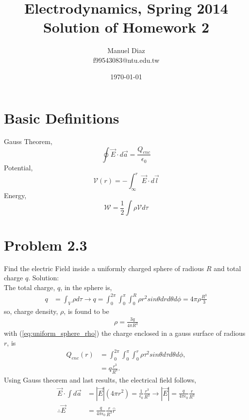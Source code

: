 

%

\title{Electrodynamics, Spring 2014 \\ Solution of Homework 2}
\author{Manuel Diaz\\
			f99543083@ntu.edu.tw\\}
\date{\today}


\maketitle

\section{Basic Definitions}
Gauss Theorem,
\begin{equation}
	\oint \vec{E}\cdot d\vec{a} = \frac{Q_{enc}}{\epsilon_0}
\end{equation}
Potential,
\begin{equation}
	\mathcal{V}(r)=-\int_{\infty}^{r} \vec{E}\cdot d\vec{l}
\end{equation}
Energy,
\begin{equation}
	\mathcal{W}=\frac{1}{2}\int \rho \mathcal{V} d\tau
\end{equation}

\section{Problem 2.3}
Find the electric Field inside a uniformly charged sphere of radious $R$ and total charge $q$. Solution: \\
The total charge, $q$, in the sphere is,  
\begin{align}
	q &= \int_{V} \rho d\tau \rightarrow q = \int_{0}^{2\pi} \int_{0}^{\pi} \int_{0}^{R} \rho r^2 sin \theta dr d\theta d\phi = 4 \pi \rho \frac{R^3}{3}
\end{align}
so, charge density, $\rho$, is found to be
\begin{align}
	\rho = \frac{3 q}{4\pi R^3}
\label{eq:uniform_sphere_rho}
\end{align}
with (\ref{eq:uniform_sphere_rho}) the charge enclosed in a gauss surface of radious $r$, is 
\begin{align}
	Q_{enc}(r) &= \int_{0}^{2\pi} \int_{0}^{\pi} \int_{0}^{r} \rho \tau^2 sin \theta d\tau d\theta d\phi, \\ 
	&= q \frac{r^3}{R^3}.
\end{align} 
Using Gauss theorem and last results, the electrical field follows,
\begin{align}
	\vec{E}\cdot\int d\vec{a} &= |\vec{E}|(4\pi r^2) = \frac{1}{\epsilon_0} \frac{r^3}{R^3} \rightarrow |\vec{E}| = \frac{q}{4\pi\epsilon_0} \frac{r}{R^3}\\
	\therefore \vec{E} &= \frac{q}{4\pi\epsilon_0}\frac{r}{R^3}\hat{r}
\end{align}

